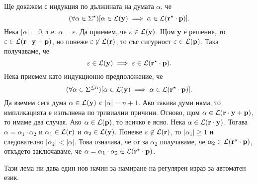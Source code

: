 \begin{hint}
  Ще докажем с индукция по дължината на думата $\alpha$, че
  \[(\forall \alpha \in \Sigma^\star)[\alpha \in \mathcal{L}(\mathbf{y}) \implies \alpha \in \mathcal{L}(\mathbf{r}^\star \cdot \mathbf{p})].\]
  Нека $|\alpha| = 0$, т.е. $\alpha = \varepsilon$.
  Да приемем, че $\varepsilon \in \mathcal{L}(\mathbf{y})$.
  Щом $\mathbf{y}$ е решение, то $\varepsilon \in \mathcal{L}(\mathbf{r} \cdot \mathbf{y} + \mathbf{p})$,
  но понеже $\varepsilon \not \in \mathcal{L}(\mathbf{r})$, то със сигурност $\varepsilon \in \mathcal{L}(\mathbf{p})$.
  Така получаваме, че
  \[\varepsilon \in \mathcal{L}(\mathbf{y}) \implies \varepsilon\in\mathcal{L}(\mathbf{r}^\star \cdot \mathbf{p}).\]
  Нека приемем като индукционно предположение, че 
  \[(\forall \alpha \in \Sigma^{\leq n})[\alpha \in \mathcal{L}(\mathbf{y}) \implies \alpha \in \mathcal{L}(\mathbf{r}^\star \cdot \mathbf{p})].\]
  Да вземем сега дума $\alpha \in \mathcal{L}(\mathbf{y})$ с $|\alpha| = n+1$. Ако такива думи няма, то импликацията е изпълнена по тривиални причини.
  Отново, щом $\alpha \in \mathcal{L}(\mathbf{r} \cdot \mathbf{y} + \mathbf{p})$, то имаме два случая.
  Ако $\alpha \in \mathcal{L}(\mathbf{p})$, то всичко е ясно.
  Нека $\alpha\in\mathcal{L}(\mathbf{r}\cdot \mathbf{y})$. Тогава $\alpha = \alpha_1 \cdot \alpha_2 $ и
  $\alpha_1 \in \mathcal{L}(\mathbf{r})$ и $\alpha_2 \in \mathcal{L}(\mathbf{y})$.
  Понеже $\varepsilon \not\in\mathcal{L}(\mathbf{r})$, то $|\alpha_1| \geq 1$ и следователно $|\alpha_2| < |\alpha|$.
  Това означава, че от \IndHyp за $\alpha_2$ получаваме, че $\alpha_2 \in \mathcal{L}(\mathbf{r}^\star\cdot \mathbf{p})$,
  откъдето заключаваме, че $\alpha = \alpha_1 \cdot \alpha_2 \in \mathcal{L}(\mathbf{r}^\star \cdot \mathbf{p})$.
\end{hint}

Тази лема ни дава един нов начин за намиране на регулярен израз за автоматен език.



